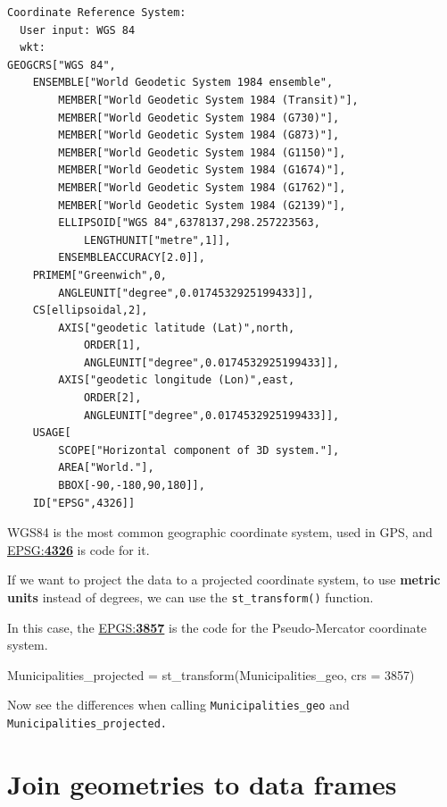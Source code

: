 \documentclass[
  letterpaper,
  DIV=11,
  numbers=noendperiod]{scrreprt}
\newenvironment{Shaded}{\begin{snugshade}}{\end{snugshade}}
\newcommand{\AttributeTok}[1]{\textcolor[rgb]{0.40,0.45,0.13}{#1}}
\newcommand{\DecValTok}[1]{\textcolor[rgb]{0.68,0.00,0.00}{#1}}
\newcommand{\FunctionTok}[1]{\textcolor[rgb]{0.28,0.35,0.67}{#1}}
\newcommand{\NormalTok}[1]{\textcolor[rgb]{0.00,0.23,0.31}{#1}}
\newcommand{\OtherTok}[1]{\textcolor[rgb]{0.00,0.23,0.31}{#1}}
\begin{document}
\begin{verbatim}
Coordinate Reference System:
  User input: WGS 84 
  wkt:
GEOGCRS["WGS 84",
    ENSEMBLE["World Geodetic System 1984 ensemble",
        MEMBER["World Geodetic System 1984 (Transit)"],
        MEMBER["World Geodetic System 1984 (G730)"],
        MEMBER["World Geodetic System 1984 (G873)"],
        MEMBER["World Geodetic System 1984 (G1150)"],
        MEMBER["World Geodetic System 1984 (G1674)"],
        MEMBER["World Geodetic System 1984 (G1762)"],
        MEMBER["World Geodetic System 1984 (G2139)"],
        ELLIPSOID["WGS 84",6378137,298.257223563,
            LENGTHUNIT["metre",1]],
        ENSEMBLEACCURACY[2.0]],
    PRIMEM["Greenwich",0,
        ANGLEUNIT["degree",0.0174532925199433]],
    CS[ellipsoidal,2],
        AXIS["geodetic latitude (Lat)",north,
            ORDER[1],
            ANGLEUNIT["degree",0.0174532925199433]],
        AXIS["geodetic longitude (Lon)",east,
            ORDER[2],
            ANGLEUNIT["degree",0.0174532925199433]],
    USAGE[
        SCOPE["Horizontal component of 3D system."],
        AREA["World."],
        BBOX[-90,-180,90,180]],
    ID["EPSG",4326]]
\end{verbatim}

WGS84 is the most common geographic coordinate system, used in GPS, and
\href{https://epsg.io/4326}{EPSG:\textbf{4326}} is code for it.

If we want to project the data to a projected coordinate system, to use
\textbf{metric units} instead of degrees, we can use the
\texttt{st\_transform()} function.

In this case, the \href{https://epsg.io/3857}{EPGS:\textbf{3857}} is the
code for the Pseudo-Mercator coordinate system.

\begin{Shaded}
\begin{Highlighting}[]
\NormalTok{Municipalities\_projected }\OtherTok{=} \FunctionTok{st\_transform}\NormalTok{(Municipalities\_geo, }\AttributeTok{crs =} \DecValTok{3857}\NormalTok{)}
\end{Highlighting}
\end{Shaded}

Now see the differences when calling \texttt{Municipalities\_geo} and
\texttt{Municipalities\_projected.}

\section{Join geometries to data
frames}\label{join-geometries-to-data-frames}
\end{document}
